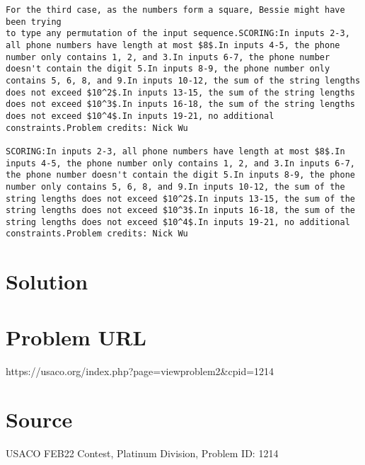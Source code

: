 \documentclass[12pt]{article}
\begin{document}
\begin{verbatim}
For the third case, as the numbers form a square, Bessie might have been trying
to type any permutation of the input sequence.SCORING:In inputs 2-3, all phone numbers have length at most $8$.In inputs 4-5, the phone number only contains 1, 2, and 3.In inputs 6-7, the phone number doesn't contain the digit 5.In inputs 8-9, the phone number only contains 5, 6, 8, and 9.In inputs 10-12, the sum of the string lengths does not exceed $10^2$.In inputs 13-15, the sum of the string lengths does not exceed $10^3$.In inputs 16-18, the sum of the string lengths does not exceed $10^4$.In inputs 19-21, no additional constraints.Problem credits: Nick Wu

SCORING:In inputs 2-3, all phone numbers have length at most $8$.In inputs 4-5, the phone number only contains 1, 2, and 3.In inputs 6-7, the phone number doesn't contain the digit 5.In inputs 8-9, the phone number only contains 5, 6, 8, and 9.In inputs 10-12, the sum of the string lengths does not exceed $10^2$.In inputs 13-15, the sum of the string lengths does not exceed $10^3$.In inputs 16-18, the sum of the string lengths does not exceed $10^4$.In inputs 19-21, no additional constraints.Problem credits: Nick Wu
\end{verbatim}

\section*{Solution}


\section*{Problem URL}
https://usaco.org/index.php?page=viewproblem2&cpid=1214

\section*{Source}
USACO FEB22 Contest, Platinum Division, Problem ID: 1214
\end{document}
